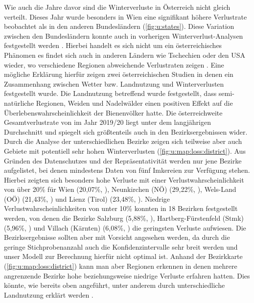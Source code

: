 Wie auch die Jahre davor sind die Winterverluste in Österreich nicht gleich verteilt. Dieses Jahr wurde besonders in Wien eine signifikant höhere Verlustrate beobachtet als in den anderen Bundesländern (\cref{fig:u:states}). Diese Variation zwischen den Bundesländern konnte auch in vorherigen Winterverlust-Analysen festgestellt werden \citep{crailsheim2018, brodschneider2018a, brodschneider2019b, oberreiter2020}. Hierbei handelt es sich nicht um ein österreichisches Phänomen es findet sich auch in anderen Ländern wie Tschechien oder den USA wieder, wo verschiedene Regionen abweichende Verlustraten zeigen \citep{brodschneider2019,vanengelsdorp2008,vanengelsdorp2010}. Eine mögliche Erklärung hierfür zeigen zwei österreichischen Studien in denen ein Zusammenhang zwischen Wetter \citep{switanek2017} bzw. Landnutzung \citep{kuchling2018} und Winterverlusten festgestellt wurde. Die Landnutzung betreffend wurde festgestellt, dass semi-natürliche Regionen, Weiden und Nadelwälder einen positiven Effekt auf die Überlebenswahrscheinlichkeit der Bienenvölker hatte.
\newline
Die österreichweite Gesamtverlustrate von  im Jahr 2019/20 liegt unter dem langjährigen Durchschnitt und spiegelt sich größtenteils auch in den Bezirksergebnissen wider. 
\newline
Durch die Analyse der unterschiedlichen Bezirke zeigen sich teilweise aber auch Gebiete mit potentiell sehr hohen Winterverlusten (\cref{fig:u:map:loss:district}). Aus Gründen des Datenschutzes und der Repräsentativität werden nur jene Bezirke aufgelistet, bei denen mindestens Daten von fünf Imkereien zur Verfügung stehen. Hierbei zeigten sich besonders hohe Verluste mit einer Verlustwahrscheinlichkeit von über 20\% für Wien (20,07\%, ), Neunkirchen (NÖ) (29,22\%, ), Wels-Land (OÖ) (21,43\%, ) und Lienz (Tirol) (23,48\%, ). Niedrige Verlustwahrscheinlichkeiten von unter 10\% konnten in 18 Bezirken festgestellt werden, von denen die Bezirke Salzburg (5,88\%, ), Hartberg-Fürstenfeld (Stmk) (5,96\%, ) und Villach (Kärnten) (6,08\%, ) die geringsten Verluste aufwiesen.
\newline
Die Bezirksergebnisse sollten aber mit Vorsicht angesehen werden, da durch die geringe Stichprobenanzahl auch die Konfidenzintervalle sehr breit werden und unser Modell zur Berechnung hierfür nicht optimal ist. Anhand der Bezirkkarte (\cref{fig:u:map:loss:district}) kann man aber Regionen erkennen in denen mehrere angrenzende Bezirke hohe beziehungsweise niedrige Verluste erfahren hatten. Dies könnte, wie bereits oben angeführt, unter anderem durch unterschiedliche Landnutzung erklärt werden \citep{kuchling2018}.

